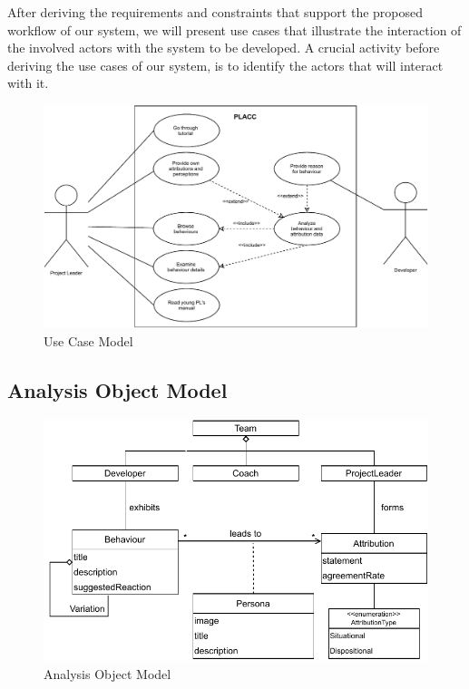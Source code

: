 After deriving the requirements and constraints that support the proposed workflow
of our system, we will present use cases that illustrate the interaction of the
involved actors with the system to be developed. A crucial activity before deriving
the use cases of our system, is to identify the actors that will interact with it.

\begin{figure}

	\includegraphics[width= \textwidth]{figures/UseCaseModel.pdf}
	\caption{Use Case Model}
	\label{fig:UseCaseModel}
\end{figure}

\subsection{Analysis Object Model}


\begin{figure}
	\includegraphics[]{figures/AOM2.pdf}
	\caption{Analysis Object Model}
	\label{fig:AOM}
\end{figure}

